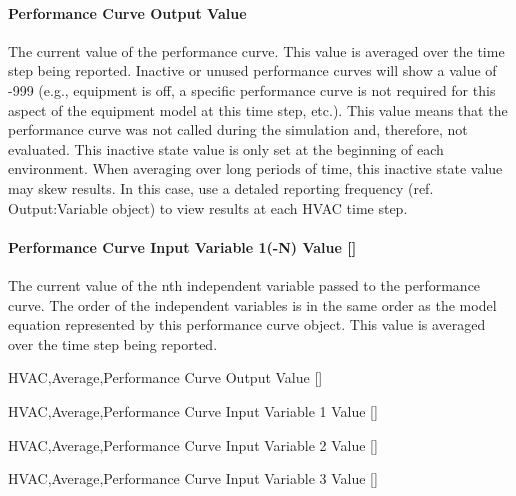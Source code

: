 \paragraph{Performance Curve Output Value}\label{performance-curve-output-value}

The current value of the performance curve. This value is averaged over the time step being reported. Inactive or unused performance curves will show a value of -999 (e.g., equipment is off, a specific performance curve is not required for this aspect of the equipment model at this time step, etc.). This value means that the performance curve was not called during the simulation and, therefore, not evaluated. This inactive state value is only set at the beginning of each environment. When averaging over long periods of time, this inactive state value may skew results. In this case, use a detaled reporting frequency (ref. Output:Variable object) to view results at each HVAC time step.

\paragraph{Performance Curve Input Variable 1(-N) Value {[]}}\label{performance-curve-input-variable-1-n-value}

The current value of the nth independent variable passed to the performance curve. The order of the independent variables is in the same order as the model equation represented by this performance curve object. This value is averaged over the time step being reported.

HVAC,Average,Performance Curve Output Value {[]}

HVAC,Average,Performance Curve Input Variable 1 Value {[]}

HVAC,Average,Performance Curve Input Variable 2 Value {[]}

HVAC,Average,Performance Curve Input Variable 3 Value {[]}
